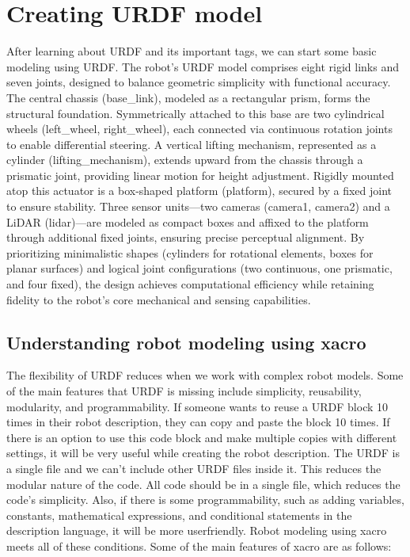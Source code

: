 \documentclass[../../main]{subfiles}
\begin{document}
\section{Creating URDF model}
After learning about URDF and its important tags, we can start some basic modeling
using URDF.
The robot’s URDF model comprises eight rigid links and seven joints,
designed to balance geometric simplicity with functional accuracy. 
The central chassis (base\_link), modeled as a rectangular prism, 
forms the structural foundation. 
Symmetrically attached to this base are two cylindrical wheels 
(left\_wheel, right\_wheel), each connected via continuous rotation 
joints to enable differential steering. A vertical lifting mechanism, 
represented as a cylinder (lifting\_mechanism), extends upward from the 
chassis through a prismatic joint, providing linear motion for height adjustment. 
Rigidly mounted atop this actuator is a box-shaped platform (platform), 
secured by a fixed joint to ensure stability. Three sensor units—two cameras 
(camera1, camera2) and a LiDAR (lidar)—are modeled as compact boxes and affixed 
to the platform through additional fixed joints, ensuring precise perceptual alignment. 
By prioritizing minimalistic shapes (cylinders for rotational elements, boxes for planar surfaces) 
and logical joint configurations (two continuous, one prismatic, and four fixed), the design achieves 
computational efficiency while retaining fidelity to the robot’s core mechanical and sensing capabilities.

\subsection{Understanding robot modeling using xacro}
The flexibility of URDF reduces when we work with complex robot models. Some of
the main features that URDF is missing include simplicity, reusability, modularity, and
programmability.
If someone wants to reuse a URDF block 10 times in their robot description, they can
copy and paste the block 10 times. If there is an option to use this code block and make
multiple copies with different settings, it will be very useful while creating the robot
description.
The URDF is a single file and we can't include other URDF files inside it. This reduces the
modular nature of the code. All code should be in a single file, which reduces the code's
simplicity.
Also, if there is some programmability, such as adding variables, constants, mathematical
expressions, and conditional statements in the description language, it will be more userfriendly.
Robot modeling using xacro meets all of these conditions. Some of the main features of
xacro are as follows:
\end{document}
